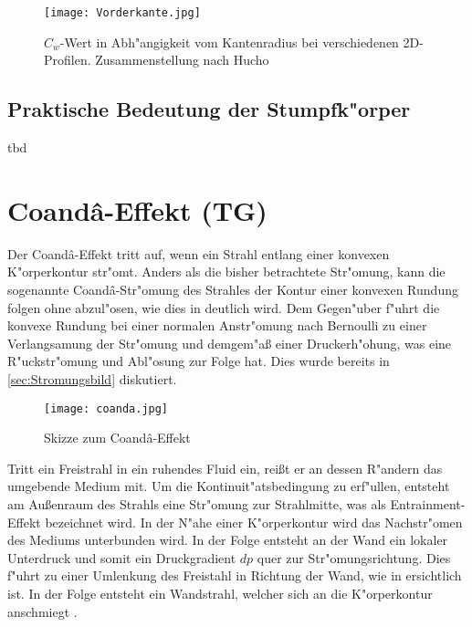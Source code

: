 \begin{figure}[h]
	\centering	\texttt{[image: Vorderkante.jpg]}
	\caption{$C_w$-Wert in Abh"angigkeit vom Kantenradius bei verschiedenen 2D-Profilen. Zusammenstellung nach Hucho\cite{Hucho.1972}}
	\label{fig:Vorderkante}
\end{figure}





\subsection{Praktische Bedeutung der Stumpfk"orper}
tbd



\section{Coand\^{a}-Effekt (TG)}

Der Coand\^{a}-Effekt tritt auf, wenn ein Strahl entlang einer konvexen K"orperkontur str"omt. Anders als die bisher betrachtete Str"omung, kann die sogenannte Coand\^{a}-Str"omung des Strahles der Kontur einer konvexen Rundung folgen ohne abzul"osen, wie dies in  deutlich wird. Dem Gegen"uber f"uhrt die konvexe Rundung bei einer normalen Anstr"omung nach Bernoulli zu einer Verlangsamung der Str"omung und demgem"a\ss{} einer Druckerh"ohung, was eine R"uckstr"omung und Abl"osung zur Folge hat. Dies wurde bereits in \ref{sec:Stromungsbild} diskutiert.

\begin{figure}[h]
	\centering
	\texttt{[image: coanda.jpg]}
	\caption{Skizze zum Coand\^{a}-Effekt \cite{Stadlberger.2016}}
	\label{fig:coanda}
\end{figure}

Tritt ein Freistrahl in ein ruhendes Fluid ein, rei\ss{}t er an dessen R"andern das umgebende Medium mit. Um die Kontinuit"atsbedingung zu erf"ullen, entsteht am Au\ss{}enraum des Strahls eine Str"omung zur Strahlmitte, was als Entrainment-Effekt bezeichnet wird. In der N"ahe einer K"orperkontur wird das Nachstr"omen des Mediums unterbunden wird. In der Folge entsteht an der Wand ein lokaler Unterdruck und somit ein Druckgradient $dp$ quer zur Str"omungsrichtung. Dies f"uhrt zu einer Umlenkung des Freistahl in Richtung der Wand, wie in  ersichtlich ist. In der Folge entsteht ein Wandstrahl, welcher sich an die K"orperkontur anschmiegt \cite{Fernholz.1966}. 

